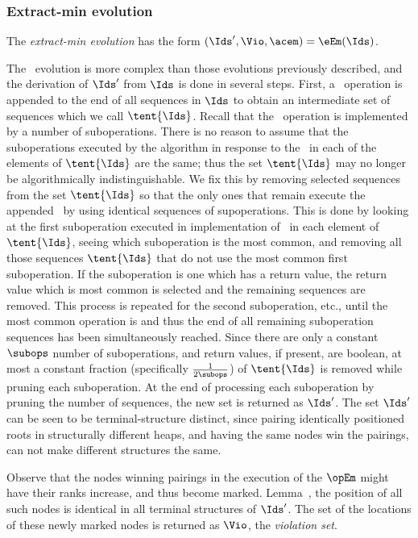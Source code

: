 \subsubsection{Extract-min evolution} 

The \emph{extract-min evolution} has the form $(\Ids',\Vio,\acem)=\eEm(\Ids)$.
\begin{fullonly}

\end{fullonly}
The \eEm\ evolution is more complex than those evolutions previously described, and the derivation of $\Ids'$ from $\Ids$ is done in several steps. First, a \opEm\ operation is appended to the end of all sequences in $\Ids$ to obtain an intermediate set of sequences which we call $\tent{\Ids}$. Recall that the \opEm\ operation is implemented by a number of suboperations. There is no reason to assume that the suboperations executed by the algorithm in response to the \opEm\ in each of the elements of $\tent{\Ids}$ are the same; thus the set  $\tent{\Ids}$ may no longer be algorithmically indistinguishable. We fix this by removing selected sequences from the set $\tent{\Ids}$ so that the only ones that remain execute the appended \opEm\ by using identical sequences of supoperations. This is done by looking at the first suboperation executed in implementation of \opEm\ in each element of $\tent{\Ids}$, seeing which suboperation is the most common, and removing all those sequences  $\tent{\Ids}$ that do not use the most common first suboperation. If the suboperation is one which has a return value, the return value which is most common is selected and the remaining sequences are removed. This process is repeated for the second suboperation, etc., until the most common operation is  and thus the end of all remaining suboperation sequences has been simultaneously reached. Since there are only a constant $\subops$ number of suboperations, and return values, if present, are boolean, at most a constant fraction (specifically $\frac{1}{2 \subops}$) of $\tent{\Ids}$ is removed while pruning each suboperation. At the end of processing each suboperation by pruning the number of sequences, the new set is returned as $\Ids'$. The set $\Ids'$ can be seen to be terminal-structure distinct, since pairing identically positioned roots in structurally different heaps, and having the same nodes win the pairings, can not make different structures the same. 


Observe that the nodes winning pairings in the execution of the $\opEm$ might have their ranks increase, and thus become marked.  Lemma~, the position of all such nodes is identical in all terminal structures of $\Ids'$. The set of the locations of these newly marked  nodes is returned as $\Vio$, the \emph{violation set}.

